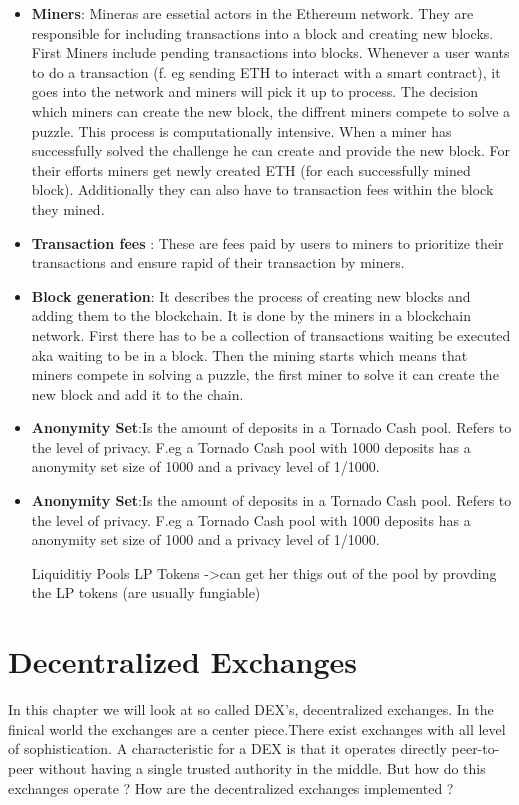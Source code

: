 \documentclass{article}
\begin{document}
\begin{itemize}
\item \textbf{Miners}: Mineras are essetial actors in the Ethereum network. They are responsible for including transactions into a block and creating new blocks. First Miners include pending transactions into blocks. Whenever a user wants to do a transaction (f. eg sending ETH to interact with a smart contract), it goes into the network and  miners will pick it up to process. The decision which miners can create the new block, the diffrent miners compete to solve a puzzle. This process is computationally intensive. When a miner has successfully solved the challenge he can create and provide the new block. For their efforts miners get newly created ETH (for each successfully mined block). Additionally they can also have to transaction fees within the block they mined.
\item \textbf{Transaction fees }:
 These are fees paid by users to miners to prioritize their transactions and ensure rapid of their transaction by miners.
\item \textbf{Block generation}: It describes the process of creating new blocks and adding them to the blockchain. It is done by the miners in a blockchain network. First there has to be a collection of transactions waiting be executed aka waiting to be in a block. Then the mining starts which means that miners compete in solving a puzzle, the first miner to solve it can create the new block and add it to the chain.
\\
\item \textbf{Anonymity Set}:Is the amount of deposits in a Tornado Cash pool. Refers to the level of privacy. F.eg a Tornado Cash pool with 1000 deposits has a anonymity set size of 1000 and a privacy level of 1/1000.




\item \textbf{Anonymity Set}:Is the amount of deposits in a Tornado Cash pool. Refers to the level of privacy. F.eg a Tornado Cash pool with 1000 deposits has a anonymity set size of 1000 and a privacy level of 1/1000.


Liquiditiy Pools
LP Tokens ->can get her thigs out of the pool by provding the LP tokens (are usually fungiable)
\end{itemize}

\section{Decentralized Exchanges}
In this chapter we will look at so called DEX's, decentralized exchanges. In the finical world the exchanges are a center piece.There exist exchanges with all level of sophistication. A characteristic for a DEX is that it operates directly peer-to-peer without having a single trusted authority in the middle. But how do this exchanges operate ? How are the decentralized exchanges implemented ?
\end{document}
